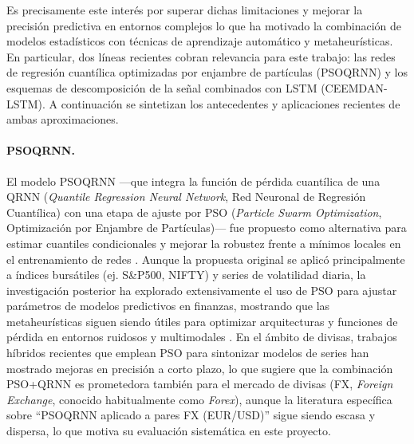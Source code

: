\documentclass[12pt]{paper}
\begin{document}
Es precisamente este interés por superar dichas limitaciones y mejorar la precisión predictiva en entornos complejos lo que ha motivado la combinación de modelos estadísticos con técnicas de aprendizaje automático y metaheurísticas. En particular, dos líneas recientes cobran relevancia para este trabajo: las redes de regresión cuantílica optimizadas por enjambre de partículas (PSOQRNN) y los esquemas de descomposición de la señal combinados con LSTM (CEEMDAN-LSTM). A continuación se sintetizan los antecedentes y aplicaciones recientes de ambas aproximaciones.

\paragraph{PSOQRNN.}
El modelo PSOQRNN —que integra la función de pérdida cuantílica de una QRNN (\textit{Quantile Regression Neural Network}, Red Neuronal de Regresión Cuantílica) con una etapa de ajuste por PSO (\textit{Particle Swarm Optimization}, Optimización por Enjambre de Partículas)— fue propuesto como alternativa para estimar cuantiles condicionales y mejorar la robustez frente a mínimos locales en el entrenamiento de redes \citep{pradeepkumar2017forecasting}. Aunque la propuesta original se aplicó principalmente a índices bursátiles (ej. S\&P500, NIFTY) y series de volatilidad diaria, la investigación posterior ha explorado extensivamente el uso de PSO para ajustar parámetros de modelos predictivos en finanzas, mostrando que las metaheurísticas siguen siendo útiles para optimizar arquitecturas y funciones de pérdida en entornos ruidosos y multimodales \citep{pradeepkumar2017forecasting, tissaoui2024pso}. En el ámbito de divisas, trabajos híbridos recientes que emplean PSO para sintonizar modelos de series han mostrado mejoras en precisión a corto plazo, lo que sugiere que la combinación PSO+QRNN es prometedora también para el mercado de divisas (FX, \textit{Foreign Exchange}, conocido habitualmente como \textit{Forex}), aunque la literatura específica sobre ``PSOQRNN aplicado a pares FX (EUR/USD)'' sigue siendo escasa y dispersa, lo que motiva su evaluación sistemática en este proyecto.
\end{document}
